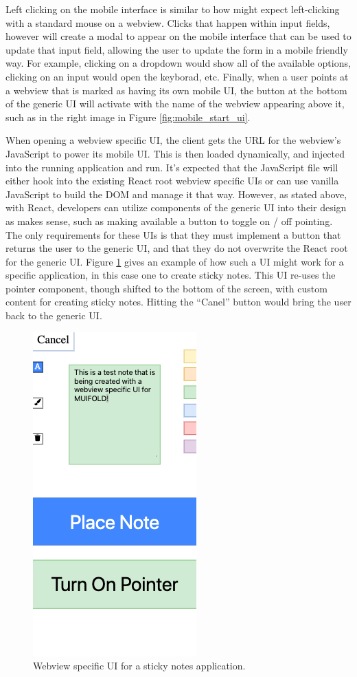 Left clicking on the mobile interface is similar to how might
expect left-clicking with a standard mouse on a webview. Clicks that
happen within input fields, however will create a modal to appear
on the mobile interface that can be used to update that input
field, allowing the user to update the form in a mobile friendly
way. For example, clicking on a dropdown would show all of
the available options, clicking on an input would open the
keyborad, etc. Finally, when a user points at a webview that
is marked as having its own mobile UI, the button at the bottom
of the generic UI will activate with the name of the webview
appearing above it, such as in the right image in Figure
\ref{fig:mobile_start_ui}.

When opening a webview specific UI, the client gets the
URL for the webview's JavaScript to power its mobile UI. This
is then loaded dynamically, and injected into the running
application and run. It's expected that the JavaScript file will
either hook into the existing React root webview specific UIs or
can use vanilla JavaScript to build the DOM and manage it that way.
However, as stated above, with React, developers can utilize
components of the generic UI into their design as makes sense,
such as making available a button to toggle on / off pointing. The
only requirements for these UIs is that they must implement a button
that returns the user to the generic UI, and that they do not
overwrite the React root for the generic UI. Figure
\ref{fig:application_specific_ui} gives an example of how such
a UI might work for a specific application, in this case one
to create sticky notes. This UI re-uses the pointer component,
though shifted to the bottom of the screen, with custom content
for creating sticky notes. Hitting the ``Canel'' button would
bring the user back to the generic UI.

\begin{figure}
\centering
  \includegraphics[width=0.40\columnwidth]{figures/application_specific_ui}
  \caption{Webview specific UI for a sticky notes application.}
  \label{fig:application_specific_ui}
\end{figure}
